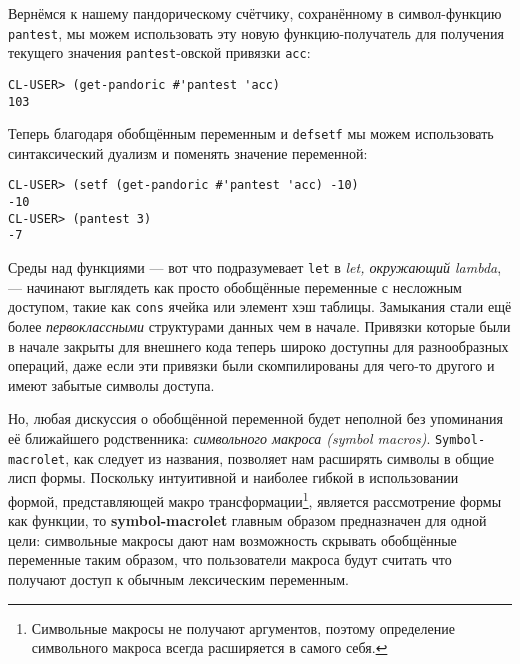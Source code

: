 Вернёмся к нашему пандорическому счётчику, сохранённому в символ-функцию \verb"pantest", мы можем использовать эту новую функ\-цию-по\-лу\-ча\-тель для получения текущего значения \verb"pantest"-овской привязки \verb"acc":

\begin{verbatim}
CL-USER> (get-pandoric #'pantest 'acc)
103
\end{verbatim}

Теперь благодаря обобщённым переменным и \verb"defsetf" мы можем использовать синтаксический дуализм и поменять значение переменной:

\begin{verbatim}
CL-USER> (setf (get-pandoric #'pantest 'acc) -10)
-10
CL-USER> (pantest 3)
-7
\end{verbatim}

Среды над функциями --- вот что подразумевает \verb"let" в \emph{let, окружающий lambda}, --- начинают выглядеть как просто обобщённые переменные с несложным доступом, такие как \verb"cons" ячейка или элемент хэш таблицы. Замыкания стали ещё более \emph{первоклассными} структурами данных чем в начале. Привязки которые были в начале закрыты для внешнего кода теперь широко доступны для разнообразных операций, даже если эти привязки были скомпилированы для чего-то другого и имеют забытые символы доступа.

Но, любая дискуссия о обобщённой переменной будет неполной без упоминания её ближайшего родственника: \emph{символьного макроса (symbol macros)}. \verb"Symbol-macrolet", как следует из названия, позволяет нам расширять символы в общие лисп формы. Поскольку интуитивной и наиболее гибкой в использовании формой, представляющей макро трансформации\footnote{Символьные макросы не получают аргументов, поэтому определение символьного макроса всегда расширяется в самого себя.}, является рассмотрение формы как функции, то \textbf{sym\-bol\--\-mac\-ro\-let} главным образом предназначен для одной цели: символьные макросы дают нам возможность скрывать обобщённые переменные таким образом, что пользователи макроса будут считать что получают доступ к обычным лексическим переменным.



